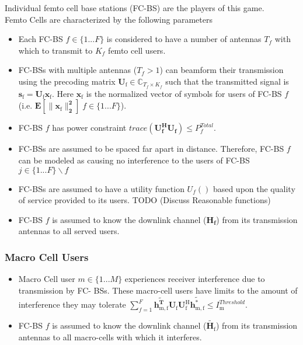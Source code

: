 \documentclass[12pt]{article}
\begin{document}
Individual femto cell base stations (FC-BS) are the players of this game.
\\
Femto Cells are characterized by the following parameters
\begin{itemize}
\item 
	Each FC-BS  $f \in \{1 ... F\}$ is considered to have a number of antennas $T_f$ with which to transmit to $K_f$ femto cell users.
\\
\item 
	FC-BSs with multiple antennas ($T_f >1$) can beamform their transmission using the precoding 	
	matrix $\mathbf{U_{\mathrm{f}}} \in \mathbb{C}_{T_f \times K_f}$ such that the transmitted 		
	signal is $\mathbf{s_{\mathrm{f}
	}}= \mathbf{U_{\mathrm{f}}}\mathbf{x_{\mathrm{f}}}$. Here $\mathbf{x_{\mathrm{f}}}$ is the 		
	normalized vector of symbols for users of FC-BS $f$ (i.e. $\mathbf{E[\|\mathbf{x_{\mathrm{f}}}	
	\|_2^2]} \; f \in \{1 ... F\}$).
\\
\item 
	FC-BS $f$ has power constraint $trace(\mathbf{U_f^H}\mathbf{U_f}) \leq P^{Total}_{f} $.
\\
\item
	 FC-BSs are assumed to be spaced far apart in distance. Therefore, FC-BS $f$ can be modeled as 
	 causing no interference to the users of FC-BS $j \in \{1 ... F\}\backslash f$
\item 
	FC-BSs are assumed to have a utility function $U_f()$ based upon the quality of service 		
	provided to its users. TODO (Discuss Reasonable functions)
\\
\item 
	FC-BS $f$ is assumed to know the downlink channel ($\mathbf{H_f}$) from its transmission 		
	antennas to all served users.
\\
\end{itemize}

\subsubsection{Macro Cell Users}

\begin{itemize}
\item 
	Macro Cell user $m \in \{1 ... M\}$ experiences receiver interference due to transmission by
	FC-	BSs. These macro-cell users have limits to the amount of interference they may tolerate 
	$\sum^F_{f=1} \mathbf{\tilde{h_{\mathrm{m,f}}^T}}  \mathbf{U_{\mathrm{f}}} 						
	\mathbf{U_{\mathrm{f}}^{\mathrm{H}}} \mathbf{\tilde{h_{\mathrm{m,f}}^*}} \leq I^{Threshold}		
	_{\mathrm{m}} $.

\item 
	FC-BS $f$ is assumed to know the downlink channel ($\tilde{\mathbf{H}_{\mathrm{f}}}$) from its
	transmission antennas to all macro-cells with which it interferes.
\\
\end{itemize}
\end{document}
